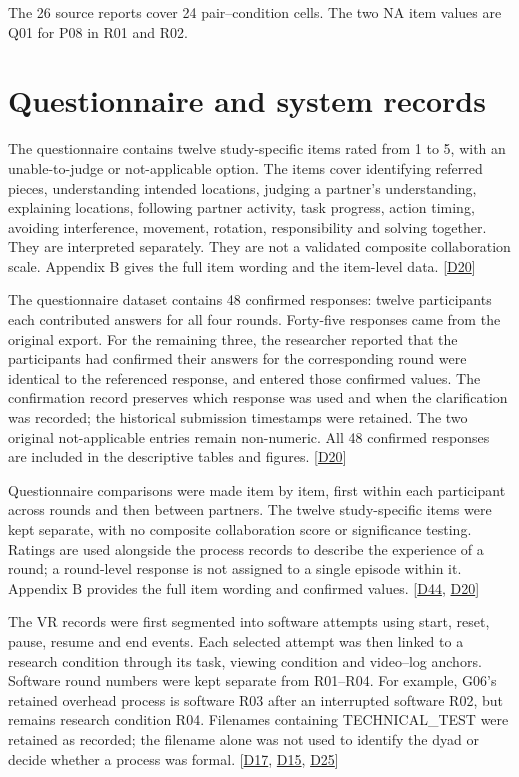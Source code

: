 The 26 source reports cover 24 pair--condition cells. The two NA item values are Q01 for P08 in R01 and R02.


\section{Questionnaire and system records}\label{sec:4-4}

The questionnaire contains twelve study-specific items rated from 1 to 5, with an unable-to-judge or not-applicable option. The items cover identifying referred pieces, understanding intended locations, judging a partner's understanding, explaining locations, following partner activity, task progress, action timing, avoiding interference, movement, rotation, responsibility and solving together. They are interpreted separately. They are not a validated composite collaboration scale. Appendix B gives the full item wording and the item-level data. [\hyperlink{src:D20}{D20}]

The questionnaire dataset contains 48 confirmed responses: twelve participants each contributed answers for all four rounds. Forty-five responses came from the original export. For the remaining three, the researcher reported that the participants had confirmed their answers for the corresponding round were identical to the referenced response, and entered those confirmed values. The confirmation record preserves which response was used and when the clarification was recorded; the historical submission timestamps were retained. The two original not-applicable entries remain non-numeric. All 48 confirmed responses are included in the descriptive tables and figures. [\hyperlink{src:D20}{D20}]

Questionnaire comparisons were made item by item, first within each participant across rounds and then between partners. The twelve study-specific items were kept separate, with no composite collaboration score or significance testing. Ratings are used alongside the process records to describe the experience of a round; a round-level response is not assigned to a single episode within it. Appendix B provides the full item wording and confirmed values. [\hyperlink{src:D44}{D44}, \hyperlink{src:D20}{D20}]

The VR records were first segmented into software attempts using start, reset, pause, resume and end events. Each selected attempt was then linked to a research condition through its task, viewing condition and video--log anchors. Software round numbers were kept separate from R01--R04. For example, G06's retained overhead process is software R03 after an interrupted software R02, but remains research condition R04. Filenames containing TECHNICAL\_TEST were retained as recorded; the filename alone was not used to identify the dyad or decide whether a process was formal. [\hyperlink{src:D17}{D17}, \hyperlink{src:D15}{D15}, \hyperlink{src:D25}{D25}]

